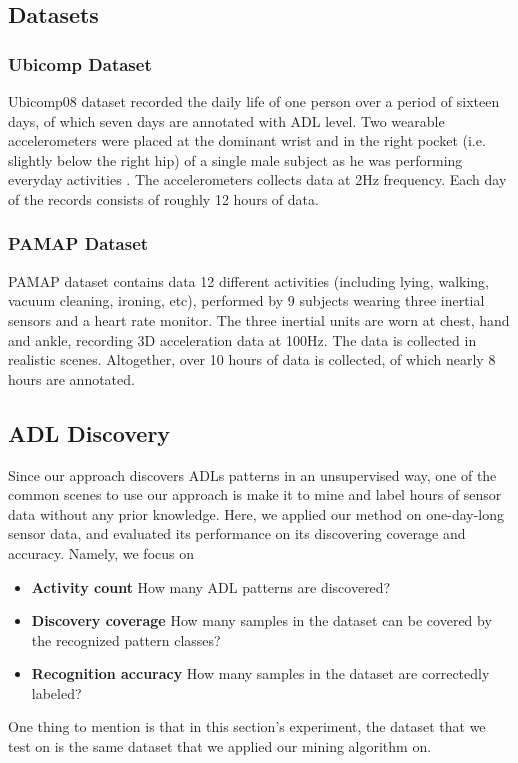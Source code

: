\documentclass{sigchi}
\begin{document}
    \subsection{Datasets}
    
    \subsubsection{Ubicomp Dataset}
    Ubicomp08 dataset \cite{huynh2008discovery} recorded the daily life of one person over a period of sixteen days, of which seven days are annotated with ADL level.
    Two wearable accelerometers were placed at the dominant wrist and in the right pocket (i.e. slightly below the right hip) of a single male subject as he was performing everyday activities .
    The accelerometers collects data at 2Hz frequency.
    Each day of the records consists of roughly 12 hours of data.
    
    \subsubsection{PAMAP Dataset}
    PAMAP dataset \cite{reiss2012introducing, reiss2012creating} contains data 12 different activities (including lying, walking, vacuum cleaning, ironing, etc), performed by 9 subjects wearing three inertial sensors and a heart rate monitor.
    The three inertial units are worn at chest, hand and ankle, recording 3D acceleration data at 100Hz.
    The data is collected in realistic scenes.
    Altogether, over 10 hours of data is collected, of which nearly 8 hours are annotated.
    

    \subsection{ADL Discovery}
    \label{subsec.exp.mining-on-same-day}

    Since our approach discovers ADLs patterns in an unsupervised way, one of the common scenes to use our approach is make it to mine and label hours of sensor data without any prior knowledge.
    Here, we applied our method on one-day-long sensor data, and evaluated its performance on its discovering coverage and accuracy.
    Namely, we focus on
        \begin{itemize}
        \item \textbf{Activity count} How many ADL patterns are discovered?
        \item \textbf{Discovery coverage} How many samples in the dataset can be covered by the recognized pattern classes?
        \item \textbf{Recognition accuracy} How many samples in the dataset are correctedly labeled?
        \end{itemize}
    One thing to mention is that in this section's experiment, the dataset that we test on is the same dataset that we applied our mining algorithm on.
\end{document}
